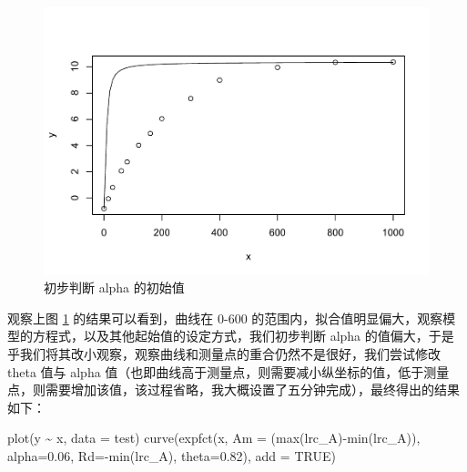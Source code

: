 \documentclass[
]{krantz}
\makeatletter
\newenvironment{Shaded}{\begin{snugshade}}{\end{snugshade}}
\newcommand{\AttributeTok}[1]{\textcolor[rgb]{0.77,0.63,0.00}{#1}}
\newcommand{\ConstantTok}[1]{\textcolor[rgb]{0.00,0.00,0.00}{#1}}
\newcommand{\FloatTok}[1]{\textcolor[rgb]{0.00,0.00,0.81}{#1}}
\newcommand{\FunctionTok}[1]{\textcolor[rgb]{0.00,0.00,0.00}{#1}}
\newcommand{\NormalTok}[1]{#1}
\newcommand{\SpecialCharTok}[1]{\textcolor[rgb]{0.00,0.00,0.00}{#1}}
\newenvironment{kframe}{%
\medskip{}
\setlength{\fboxsep}{.8em}
 \def\at@end@of@kframe{}%
 \ifinner\ifhmode%
  \def\at@end@of@kframe{\end{minipage}}%
  \begin{minipage}{\columnwidth}%
 \fi\fi%
 \def\FrameCommand##1{\hskip\@totalleftmargin \hskip-\fboxsep
 \colorbox{shadecolor}{##1}\hskip-\fboxsep
     \hskip-\linewidth \hskip-\@totalleftmargin \hskip\columnwidth}%
 \MakeFramed {\advance\hsize-\width
   \@totalleftmargin\z@ \linewidth\hsize
   \@setminipage}}%
 {\par\unskip\endMakeFramed%
 \at@end@of@kframe}
\renewenvironment{Shaded}{\begin{kframe}}{\end{kframe}}
\makeatother
\begin{document}
\begin{figure}
\centering
\includegraphics{bookdown_files/figure-latex/pomp-1.pdf}
\caption{\label{fig:pomp}初步判断 alpha 的初始值}
\end{figure}

观察上图 \ref{fig:pomp} 的结果可以看到，曲线在 0-600 的范围内，拟合值明显偏大，观察模型的方程式，以及其他起始值的设定方式，我们初步判断 alpha 的值偏大，于是乎我们将其改小观察，观察曲线和测量点的重合仍然不是很好，我们尝试修改 theta 值与 alpha 值（也即曲线高于测量点，则需要减小纵坐标的值，低于测量点，则需要增加该值，该过程省略，我大概设置了五分钟完成），最终得出的结果如下：

\begin{Shaded}
\begin{Highlighting}[]
\FunctionTok{plot}\NormalTok{(y }\SpecialCharTok{\textasciitilde{}}\NormalTok{ x, }\AttributeTok{data =}\NormalTok{ test)}
\FunctionTok{curve}\NormalTok{(}\FunctionTok{expfct}\NormalTok{(x, }\AttributeTok{Am =}\NormalTok{ (}\FunctionTok{max}\NormalTok{(lrc\_A)}\SpecialCharTok{{-}}\FunctionTok{min}\NormalTok{(lrc\_A)),}
     \AttributeTok{alpha=}\FloatTok{0.06}\NormalTok{, }\AttributeTok{Rd=}\SpecialCharTok{{-}}\FunctionTok{min}\NormalTok{(lrc\_A), }\AttributeTok{theta=}\FloatTok{0.82}\NormalTok{), }\AttributeTok{add =} \ConstantTok{TRUE}\NormalTok{)}
\end{Highlighting}
\end{Shaded}
\end{document}
